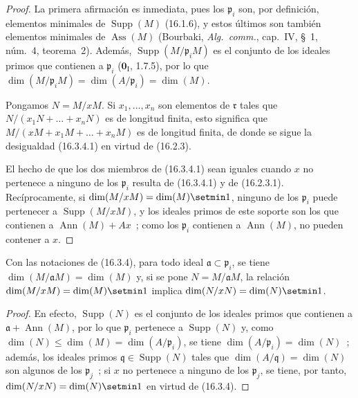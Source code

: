 \begin{proof}
La primera afirmación es inmediata, pues los $\mathfrak{p}_i$ son, por
definición, elementos minimales de $\operatorname{Supp}(M)$ (16.1.6), y estos
últimos son también elementos minimales de $\operatorname{Ass}(M)$ (Bourbaki,
\emph{Alg.~comm.}, cap.~IV, \S~1, núm.~4, teorema~2). Además,
$\operatorname{Supp}(M/\mathfrak{p}_iM)$ es el conjunto de los ideales primos
que contienen a $\mathfrak{p}_i$ ($\mathbf{0}_{\mathrm I}$, 1.7.5), por lo que
$\dim(M/\mathfrak{p}_iM)=\dim(A/\mathfrak{p}_i)=\dim(M)$.

Pongamos $N=M/xM$. Si $x_1,\ldots,x_n$ son elementos de $\mathfrak{r}$ tales
que $N/(x_1N+\ldots+x_nN)$ es de longitud finita, esto significa que
$M/(xM+x_1M+\ldots+x_nM)$ es de longitud finita, de donde se sigue la
desigualdad (16.3.4.1) en virtud de (16.2.3).

El hecho de que los dos miembros de (16.3.4.1) sean iguales cuando $x$ no
pertenece a ninguno de los $\mathfrak{p}_i$ resulta de (16.3.4.1) y de
(16.2.3.1). Recíprocamente, si
$\dim(M/xM)=\dim(M)\setmin 1$, ninguno de los $\mathfrak{p}_i$ puede pertenecer a
$\operatorname{Supp}(M/xM)$, y los ideales primos de este soporte son los que
contienen a $\operatorname{Ann}(M)+Ax$~; como los $\mathfrak{p}_i$ contienen a
$\operatorname{Ann}(M)$, no pueden contener a $x$.
\end{proof}

\begin{corollary}[16.3.5]
\label{0.16.3.5-es}
Con las notaciones de \textup{(16.3.4)}, para todo ideal
$\mathfrak{a}\subset\mathfrak{p}_i$, se tiene
$\dim(M/\mathfrak{a}M)=\dim(M)$ y, si se pone
$N=M/\mathfrak{a}M$, la relación $\dim(M/xM)=\dim(M)\setmin 1$ implica
$\dim(N/xN)=\dim(N)\setmin 1$.
\end{corollary}

\begin{proof}
En efecto, $\operatorname{Supp}(N)$ es el conjunto de los ideales primos que
contienen a $\mathfrak{a}+\operatorname{Ann}(M)$, por lo que $\mathfrak{p}_i$
pertenece a $\operatorname{Supp}(N)$ y, como
$\dim(N)\leq\dim(M)=\dim(A/\mathfrak{p}_i)$, se tiene
$\dim(A/\mathfrak{p}_i)=\dim(N)$~; además, los ideales primos
$\mathfrak{q}\in\operatorname{Supp}(N)$ tales que
$\dim(A/\mathfrak{q})=\dim(N)$ son algunos de los $\mathfrak{p}_j$~; si $x$
no pertenece a ninguno de los $\mathfrak{p}_j$, se tiene, por tanto,
$\dim(N/xN)=\dim(N)\setmin 1$ en virtud de (16.3.4).
\end{proof}

